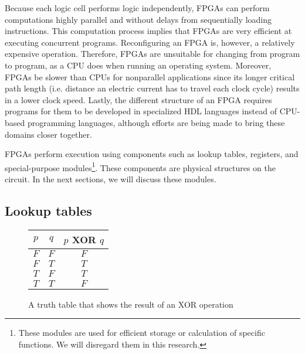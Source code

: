 Because each logic cell performs logic independently, FPGAs can perform computations highly parallel and without delays from sequentially loading instructions. This computation process implies that FPGAs are very efficient at executing concurrent programs. Reconfiguring an FPGA is, however, a relatively expensive operation. Therefore, FPGAs are unsuitable for changing from program to program, as a CPU does when running an operating system. Moreover, FPGAs be slower than CPUs for nonparallel applications since its longer critical path length (i.e. distance an electric current has to travel each clock cycle) results in a lower clock speed. Lastly, the different structure of an FPGA requires programs for them to be developed in specialized HDL languages instead of CPU-based programming languages, although efforts are being made to bring these domains closer together.

FPGAs perform execution using components such as lookup tables, registers, and special-purpose modules\footnote{These modules are used for efficient storage or calculation of specific functions. We will disregard them in this research.}. These components are physical structures on the circuit. In the next sections, we will discuss these modules.
\subsection{Lookup tables}


\begin{figure}
\centering
\begin{tabular}{|c|c|c|}
\hline
$p$ & $q$ & $p$ XOR $q$ \\ \hline
$F$ & $F$ & $F$       \\ \hline
$F$ & $T$ & $T$       \\ \hline
$T$ & $F$ & $T$       \\ \hline
$T$ & $T$ & $F$       \\ \hline
\end{tabular}
\caption{A truth table that shows the result of an XOR operation}
\label{fig:truth_table}
\end{figure}

